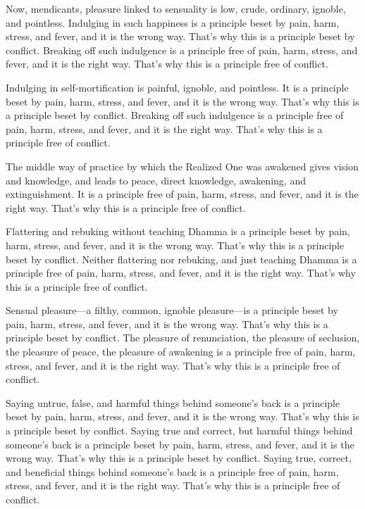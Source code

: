 \documentclass[12pt,openany]{book}%
\begin{document}
Now, mendicants, pleasure linked to sensuality is low, crude, ordinary, ignoble, and pointless. Indulging in such happiness is a principle beset by pain, harm, stress, and fever, and it is the wrong way. That’s why this is a principle beset by conflict. Breaking off such indulgence is a principle free of pain, harm, stress, and fever, and it is the right way. That’s why this is a principle free of conflict. 

Indulging in self-mortification is painful, ignoble, and pointless. It is a principle beset by pain, harm, stress, and fever, and it is the wrong way. That’s why this is a principle beset by conflict. Breaking off such indulgence is a principle free of pain, harm, stress, and fever, and it is the right way. That’s why this is a principle free of conflict. 

The middle way of practice by which the Realized One was awakened gives vision and knowledge, and leads to peace, direct knowledge, awakening, and extinguishment. It is a principle free of pain, harm, stress, and fever, and it is the right way. That’s why this is a principle free of conflict. 

Flattering and rebuking without teaching Dhamma is a principle beset by pain, harm, stress, and fever, and it is the wrong way. That’s why this is a principle beset by conflict. Neither flattering nor rebuking, and just teaching Dhamma is a principle free of pain, harm, stress, and fever, and it is the right way. That’s why this is a principle free of conflict. 

Sensual pleasure—a filthy, common, ignoble pleasure—is a principle beset by pain, harm, stress, and fever, and it is the wrong way. That’s why this is a principle beset by conflict. The pleasure of renunciation, the pleasure of seclusion, the pleasure of peace, the pleasure of awakening is a principle free of pain, harm, stress, and fever, and it is the right way. That’s why this is a principle free of conflict. 

Saying untrue, false, and harmful things behind someone’s back is a principle beset by pain, harm, stress, and fever, and it is the wrong way. That’s why this is a principle beset by conflict. Saying true and correct, but harmful things behind someone’s back is a principle beset by pain, harm, stress, and fever, and it is the wrong way. That’s why this is a principle beset by conflict. Saying true, correct, and beneficial things behind someone’s back is a principle free of pain, harm, stress, and fever, and it is the right way. That’s why this is a principle free of conflict. 
\end{document}
